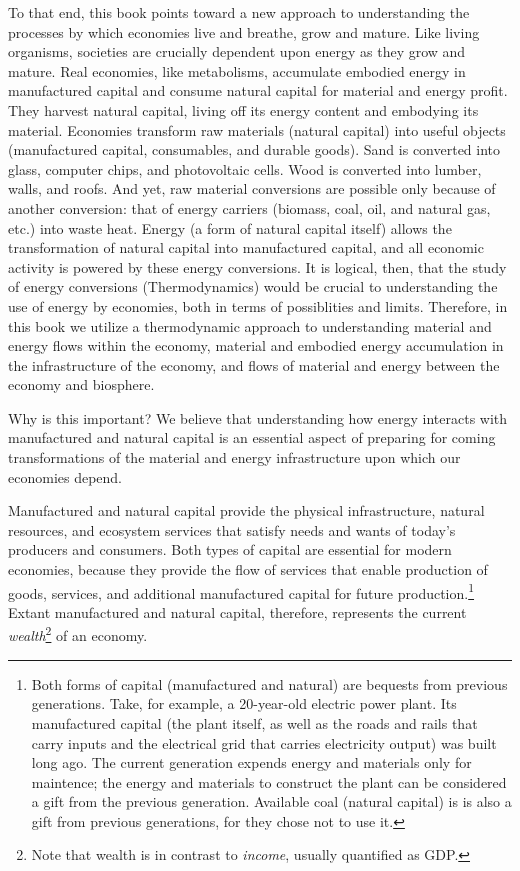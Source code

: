 To that end, this book points toward a new approach 
to understanding the processes by which economies 
live and breathe, grow and mature.
Like living organisms,
societies are crucially dependent upon energy as they grow and mature.
Real economies, like metabolisms,
accumulate embodied energy 
in manufactured capital and
consume natural capital 
for material and energy profit.
They harvest natural capital, living off its energy content and
embodying its material.
Economies transform raw materials (natural capital) into useful objects 
(manufactured capital, consumables, and durable goods). 
Sand is converted into glass, computer chips, and photovoltaic cells.
Wood is converted into lumber, walls, and roofs.
And yet, raw material conversions are possible only because of another conversion:
that of energy carriers (biomass, coal, oil, and natural gas, etc.)
into waste heat.
Energy (a form of natural capital itself) allows the transformation of natural capital
into manufactured capital, 
and all economic activity is powered by these energy conversions. 
It is logical, then, that the study of energy conversions (Thermodynamics) 
would be crucial to understanding the use of energy by economies,
both in terms of possiblities and limits.
Therefore, in this book we utilize
a thermodynamic approach to understanding
material and energy flows within the economy,
material and embodied energy accumulation in the infrastructure of the economy, and
flows of material and energy between the economy and biosphere.

Why is this important? 
We believe that understanding how energy interacts with  
manufactured and natural capital
is an essential aspect of preparing for coming transformations 
of the material and energy infrastructure upon which our economies depend. 

Manufactured and natural capital provide
the physical infrastructure, natural resources, and
ecosystem services that satisfy needs and wants 
of today's producers and consumers.
Both types of capital are essential for modern economies, because
they provide the flow of services that enable production of 
goods, services, and additional manufactured capital 
for future production.\footnote{Both 
	forms of capital (manufactured and natural) 
	are bequests from previous generations. 
	Take, for example, a 20-year-old electric power plant.
	Its manufactured capital (the plant itself, 
	as well as the roads and rails that carry inputs 
	and the electrical grid that carries electricity output) 
	was built long ago. 
	The current generation
	expends energy and materials only for maintence;
	the energy and materials to construct the plant 
	can be considered a gift from the previous generation.
	Available coal (natural capital) is is also a gift from previous generations,
	for they chose not to use it.
	}
Extant manufactured and natural capital, therefore, represents 
the current \emph{wealth}\footnote{Note 
	that wealth is in contrast to \emph{income}, 
	usually quantified as GDP.
	}
of an economy.

